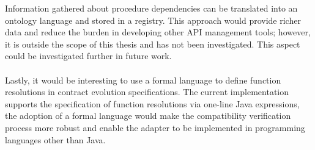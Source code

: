 Information gathered about procedure dependencies can be translated into an ontology language and stored in a registry.
This approach would provide richer data and reduce the burden in developing other API management tools;
however, it is outside the scope of this thesis and has not been investigated.
This aspect could be investigated further in future work.

\paragraph{}

Lastly, it would be interesting to use a formal language to define function resolutions in contract evolution specifications.
The current implementation supports the specification of function resolutions via one-line Java expressions,
the adoption of a formal language would make the compatibility verification process more robust and enable the adapter to be implemented in programming languages other than Java.


